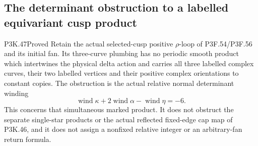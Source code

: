 \subsection{The determinant obstruction to a labelled equivariant cusp product}
\begin{statement}{P3K.47}{Proved}
Retain the actual selected-cusp positive \(\rho\)-loop of
P3F.54/P3F.56 and its initial fan. Its three-curve plumbing has no
periodic smooth product which intertwines the physical delta
action and carries all three labelled complex curves, their two
labelled vertices and their positive complex orientations to
constant copies. The obstruction is the actual relative normal
determinant winding
\[
 \operatorname{wind}\kappa+2\operatorname{wind}\alpha
                  -\operatorname{wind}\eta=-6.
\]
This concerns that simultaneous marked product. It does not obstruct
the separate single-star products or the actual reflected fixed-edge
cap map of P3K.46, and it does not assign a nonfixed relative integer
or an arbitrary-fan return formula.
\end{statement}

